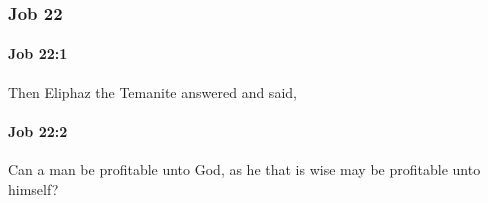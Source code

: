 	\subsubsection{Job 22} %
		\label{JOB-22}

		\paragraph{Job 22:1} %
			\label{JOB-22-1}

			Then Eliphaz the Temanite answered and said,


		\paragraph{Job 22:2} %
			\label{JOB-22-2}

			Can a man be profitable unto God, as he that is wise may be profitable unto himself?


